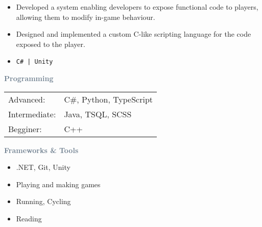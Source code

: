 \documentclass[10pt,a4paper,withhyper]{altacv}
\begin{document}
\begin{paracol}{2}
\divider

\begin{itemize}
\item Developed a system enabling developers to expose functional code to players, allowing them to modify in-game behaviour.
\item Designed and implemented a custom C-like scripting language for the code exposed to the player.
\item[] \color{black}\texttt{C\# | Unity}
\end{itemize}

\switchcolumn


\textcolor{SlateGrey}{\textbf{Programming}}
\smallskip
  \begin{tabular}{ll}
      Advanced: &C\#, Python, TypeScript \\
      Intermediate: &Java, TSQL, SCSS \\
      Begginer: &C++ \\
  \end{tabular}

\divider

\textcolor{SlateGrey}{\textbf{Frameworks \& Tools}}
\smallskip
\begin{itemize}
    \item[] .NET, Git, Unity
\end{itemize}


\divider


\medskip



\divider


\divider


\divider


\medskip

\begin{itemize}
\item Playing and making games
\item Running, Cycling
\item Reading
\end{itemize}

\end{paracol}
\end{document}
